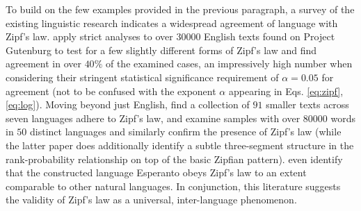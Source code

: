 \documentclass[10pt]{article}
\begin{document}
\begin{flushleft}
    \hspace*{0.5in} To build on the few examples provided in the previous paragraph, a survey of the existing linguistic research indicates a widespread agreement of language with Zipf's law. \textcite{large_scale_english} apply strict analyses to over $30000$ English texts found on Project Gutenburg to test for a few slightly different forms of Zipf's law and find agreement in over $40\%$ of the examined cases, an impressively high number when considering their stringent statistical significance requirement of $\alpha = 0.05$ for agreement (not to be confused with the exponent $\alpha$ appearing in Eqs. \ref{eq:zipf}, \ref{eq:log}). Moving beyond just English, \textcite{seven_lang} find a collection of $91$ smaller texts across seven languages adhere to Zipf's law, and \textcite{fifty_lang} examine samples with over $80000$ words in $50$ distinct languages and similarly confirm the presence of Zipf's law (while the latter paper does additionally identify a subtle three-segment structure in the rank-probability relationship on top of the basic Zipfian pattern). \textcite{esperanto} even identify that the constructed language Esperanto obeys Zipf's law to an extent comparable to other natural languages. In conjunction, this literature suggests the validity of Zipf's law as a universal, inter-language phenomenon.
    

\end{flushleft}
\end{document}
